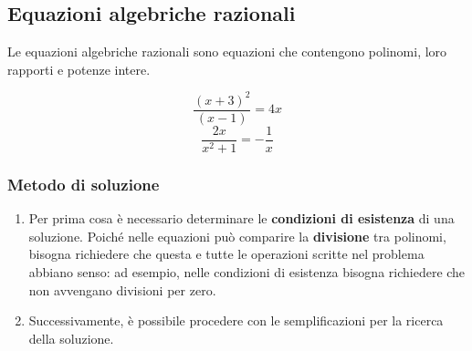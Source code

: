\subsection{Equazioni algebriche razionali}
\begin{definition} Le equazioni algebriche razionali sono equazioni che contengono polinomi, loro rapporti e potenze intere.
\end{definition}
\begin{example}
\begin{equation}
    \dfrac{(x + 3)^2}{(x-1)} = 4 x 
\end{equation}
\begin{equation}
    \dfrac{2x}{x^2+1} = -\dfrac{1}{x}
\end{equation}
\end{example}

\subsubsection{Metodo di soluzione}
\begin{enumerate}
    \item Per prima cosa è necessario determinare le \textbf{condizioni di esistenza} di una soluzione. Poiché nelle equazioni può comparire la \textbf{divisione} tra polinomi, bisogna richiedere che questa e tutte le operazioni scritte nel problema abbiano senso: ad esempio, nelle condizioni di esistenza bisogna richiedere che non avvengano divisioni per zero.
    \item Successivamente, è possibile procedere con le semplificazioni per la ricerca della soluzione.
\end{enumerate}

